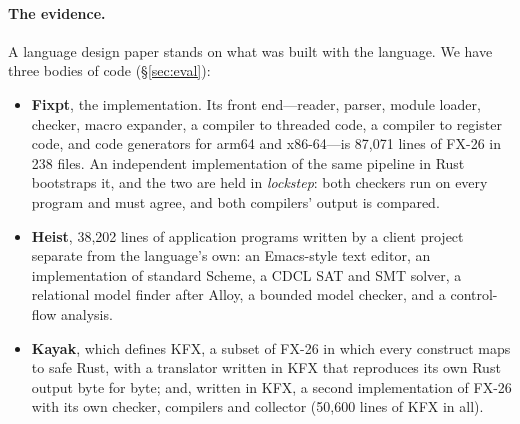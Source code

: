 \documentclass[acmsmall,screen,review]{acmart}
\newcommand{\fx}{FX-26}
\begin{document}
\paragraph{The evidence.} A language design paper stands on what was
built with the language. We have three bodies of code
(\S\ref{sec:eval}):
\begin{itemize}
\item \textbf{Fixpt}, the implementation. Its front end---reader, parser,
  module loader, checker, macro expander, a compiler to threaded code,
  a compiler to register code, and code generators for arm64 and
  x86-64---is 87,071 lines of \fx{} in 238 files. An independent
  implementation of the same pipeline in Rust bootstraps it, and the two
  are held in \emph{lockstep}: both checkers run on every program and
  must agree, and both compilers' output is compared.
\item \textbf{Heist}, 38,202 lines of application programs written by
  a client project separate from the language's own: an
  Emacs-style text editor, an implementation of standard Scheme, a
  CDCL SAT and SMT solver, a relational model finder after Alloy, a
  bounded model checker, and a control-flow analysis.
\item \textbf{Kayak}, which defines KFX, a subset of \fx{} in which every
  construct maps to safe Rust, with a translator written in KFX that
  reproduces its own Rust output byte for byte; and, written in KFX, a
  second implementation of \fx{} with its own checker,
  compilers and collector (50,600 lines of KFX in all).
\end{itemize}
\end{document}
